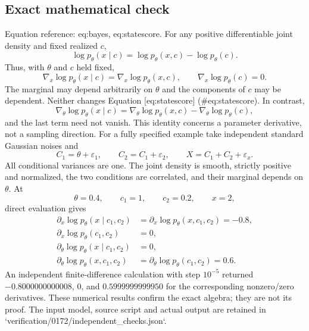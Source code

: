 \documentclass[10pt]{article}
\begin{document}
\subsection*{Exact mathematical check}
Equation reference: eq:bayes, eq:statescore. For any positive differentiable joint density and fixed realized \(c\), \[
\log p_\theta(x\mid c)=\log p_\theta(x,c)-\log p_\theta(c).\] Thus, with \(\theta\) and \(c\) held fixed, \[
\nabla_x\log p_\theta(x\mid c)=\nabla_x\log p_\theta(x,c),
\qquad \nabla_x\log p_\theta(c)=0.\] The marginal may depend arbitrarily on \(\theta\) and the components of \(c\) may be dependent. Neither changes Equation [eq:statescore] (\#eq:statescore). In contrast, \[\nabla_\theta\log p_\theta(x\mid c)
=\nabla_\theta\log p_\theta(x,c)-\nabla_\theta\log p_\theta(c),\] and the last term need not vanish. This identity concerns a parameter derivative, not a sampling direction. For a fully specified example take independent standard Gaussian noises and \[C_1=\theta+\varepsilon_1,\qquad
C_2=C_1+\varepsilon_2,\qquad
X=C_1+C_2+\varepsilon_x.\] All conditional variances are one. The joint density is smooth, strictly positive and normalized, the two conditions are correlated, and their marginal depends on \(\theta\). At \[\theta=0.4,\qquad c_1=1,\qquad c_2=0.2,\qquad x=2,\] direct evaluation gives \[\begin{aligned}
\partial_x\log p_\theta(x\mid c_1,c_2)
&=\partial_x\log p_\theta(x,c_1,c_2)=-0.8,\\
\partial_x\log p_\theta(c_1,c_2)&=0,\\
\partial_\theta\log p_\theta(x\mid c_1,c_2)&=0,\\
\partial_\theta\log p_\theta(x,c_1,c_2)
&=\partial_\theta\log p_\theta(c_1,c_2)=0.6.\end{aligned}\] An independent finite-difference calculation with step \(10^{-5}\) returned \(-0.8000000000008\), \(0\), and \(0.5999999999950\) for the corresponding nonzero/zero derivatives. These numerical results confirm the exact algebra; they are not its proof. The input model, source script and actual output are retained in `verification/0172/independent\_checks.json`.\par
\end{document}
